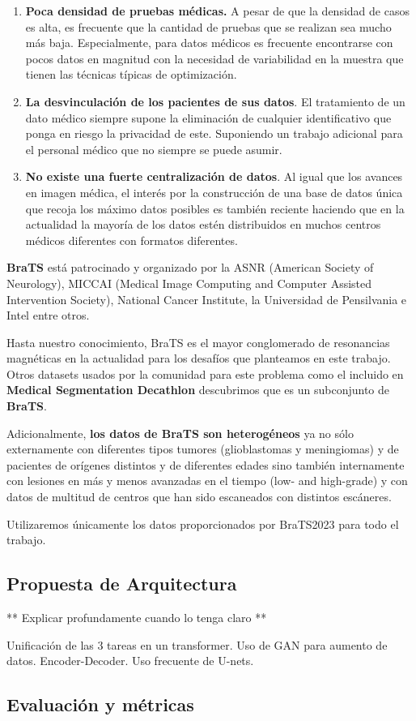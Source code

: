 \begin{enumerate}
	\item \textbf{Poca densidad de pruebas médicas.} A pesar de que la densidad de casos es alta, es frecuente que la cantidad de pruebas que se realizan sea mucho más baja. Especialmente, para datos médicos es frecuente encontrarse con pocos datos en magnitud con la necesidad de variabilidad en la muestra que tienen las técnicas típicas de optimización.
	
	\item \textbf{La desvinculación de los pacientes de sus datos}. El tratamiento de un dato médico siempre supone la eliminación de cualquier identificativo que ponga en riesgo la privacidad de este. Suponiendo un trabajo adicional para el personal médico que no siempre se puede asumir.
	
	\item \textbf{No existe una fuerte centralización de datos}. Al igual que los avances en imagen médica, el interés por la construcción de una base de datos única que recoja los máximo datos posibles es también reciente haciendo que en la actualidad la mayoría de los datos estén distribuidos en muchos centros médicos diferentes con formatos diferentes.
	
\end{enumerate}

\textbf{BraTS} está patrocinado y organizado por la ASNR (American Society of Neurology), MICCAI (Medical Image Computing and Computer Assisted Intervention Society), National Cancer Institute, la Universidad de Pensilvania e Intel entre otros.

Hasta nuestro conocimiento, BraTS es el mayor conglomerado de resonancias magnéticas en la actualidad para los desafíos que planteamos en este trabajo. Otros datasets usados por la comunidad para este problema como el incluido en \textbf{Medical Segmentation Decathlon} descubrimos que es un subconjunto de \textbf{BraTS}.

Adicionalmente, \textbf{los datos de BraTS son heterogéneos} ya no sólo externamente con diferentes tipos tumores (glioblastomas y meningiomas) y de pacientes de orígenes distintos y de diferentes edades sino también internamente con lesiones en más y menos avanzadas en el tiempo (low- and high-grade) y con datos de multitud de centros que han sido escaneados con distintos escáneres.

Utilizaremos únicamente los datos proporcionados por BraTS2023 para todo el trabajo.

\subsection{Propuesta de Arquitectura}

** Explicar profundamente cuando lo tenga claro **

Unificación de las 3 tareas en un transformer. Uso de GAN para aumento de datos. Encoder-Decoder. Uso frecuente de U-nets.

\subsection{Evaluación y métricas}



